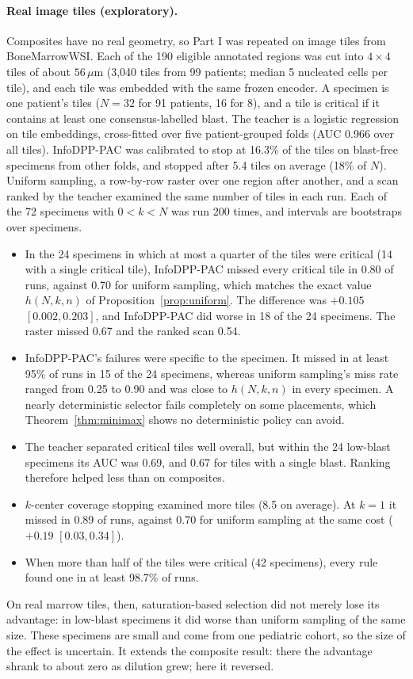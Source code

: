 \documentclass[11pt]{article}
\theoremstyle{remark}
\theoremstyle{definition}
\begin{document}
\paragraph{Real image tiles (exploratory).} Composites have no real geometry, so Part I was repeated on image tiles from BoneMarrowWSI. Each of the 190 eligible annotated regions was cut into $4\times4$ tiles of about $56\,\mu$m (3,040 tiles from 99 patients; median 5 nucleated cells per tile), and each tile was embedded with the same frozen encoder. A specimen is one patient's tiles ($N=32$ for 91 patients, 16 for 8), and a tile is critical if it contains at least one consensus-labelled blast. The teacher is a logistic regression on tile embeddings, cross-fitted over five patient-grouped folds (AUC 0.966 over all tiles). InfoDPP-PAC was calibrated to stop at 16.3\% of the tiles on blast-free specimens from other folds, and stopped after 5.4 tiles on average (18\% of $N$). Uniform sampling, a row-by-row raster over one region after another, and a scan ranked by the teacher examined the same number of tiles in each run. Each of the 72 specimens with $0<k<N$ was run 200 times, and intervals are bootstraps over specimens.
\begin{itemize}
\item In the 24 specimens in which at most a quarter of the tiles were critical (14 with a single critical tile), InfoDPP-PAC missed every critical tile in 0.80 of runs, against 0.70 for uniform sampling, which matches the exact value $h(N,k,n)$ of Proposition~\ref{prop:uniform}. The difference was $+0.105$ $[0.002,0.203]$, and InfoDPP-PAC did worse in 18 of the 24 specimens. The raster missed 0.67 and the ranked scan 0.54.
\item InfoDPP-PAC's failures were specific to the specimen. It missed in at least 95\% of runs in 15 of the 24 specimens, whereas uniform sampling's miss rate ranged from 0.25 to 0.90 and was close to $h(N,k,n)$ in every specimen. A nearly deterministic selector fails completely on some placements, which Theorem~\ref{thm:minimax} shows no deterministic policy can avoid.
\item The teacher separated critical tiles well overall, but within the 24 low-blast specimens its AUC was 0.69, and 0.67 for tiles with a single blast. Ranking therefore helped less than on composites.
\item $k$-center coverage stopping examined more tiles (8.5 on average). At $k=1$ it missed in 0.89 of runs, against 0.70 for uniform sampling at the same cost ($+0.19$ $[0.03,0.34]$).
\item When more than half of the tiles were critical (42 specimens), every rule found one in at least 98.7\% of runs.
\end{itemize}
On real marrow tiles, then, saturation-based selection did not merely lose its advantage: in low-blast specimens it did worse than uniform sampling of the same size. These specimens are small and come from one pediatric cohort, so the size of the effect is uncertain. It extends the composite result: there the advantage shrank to about zero as dilution grew; here it reversed.
\end{document}
